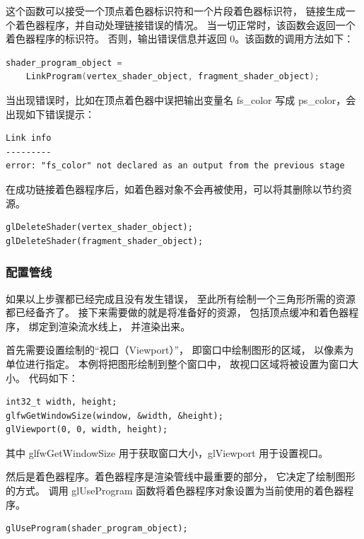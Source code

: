 \documentclass[fontset=windows]{ctexart}
\begin{document}
这个函数可以接受一个顶点着色器标识符和一个片段着色器标识符，
链接生成一个着色器程序，并自动处理链接错误的情况。
当一切正常时，该函数会返回一个着色器程序的标识符。
否则，输出错误信息并返回 0。该函数的调用方法如下：

\begin{lstlisting}[language=c++]
shader_program_object =
    LinkProgram(vertex_shader_object, fragment_shader_object);
\end{lstlisting}

当出现错误时，比如在顶点着色器中误把输出变量名 fs\_color 写成 ps\_color，会出现如下错误提示：

\begin{lstlisting}
Link info
---------
error: "fs_color" not declared as an output from the previous stage
\end{lstlisting}

在成功链接着色器程序后，如着色器对象不会再被使用，可以将其删除以节约资源。

\begin{lstlisting}
glDeleteShader(vertex_shader_object);
glDeleteShader(fragment_shader_object);
\end{lstlisting}

\subsubsection{配置管线}

\label{sec-gl:fixing-pipeline}

如果以上步骤都已经完成且没有发生错误，
至此所有绘制一个三角形所需的资源都已经备齐了。
接下来需要做的就是将准备好的资源，
包括顶点缓冲和着色器程序，
绑定到渲染流水线上，
并渲染出来。

首先需要设置绘制的“视口（Viewport）”，
即窗口中绘制图形的区域，
以像素为单位进行指定。
本例将把图形绘制到整个窗口中，
故视口区域将被设置为窗口大小。
代码如下：

\begin{lstlisting}
int32_t width, height;
glfwGetWindowSize(window, &width, &height);
glViewport(0, 0, width, height);
\end{lstlisting}

其中 glfwGetWindowSize 用于获取窗口大小，glViewport 用于设置视口。

然后是着色器程序。着色器程序是渲染管线中最重要的部分，
它决定了绘制图形的方式。
调用 glUseProgram 函数将着色器程序对象设置为当前使用的着色器程序。

\begin{lstlisting}
glUseProgram(shader_program_object);
\end{lstlisting}
\end{document}
